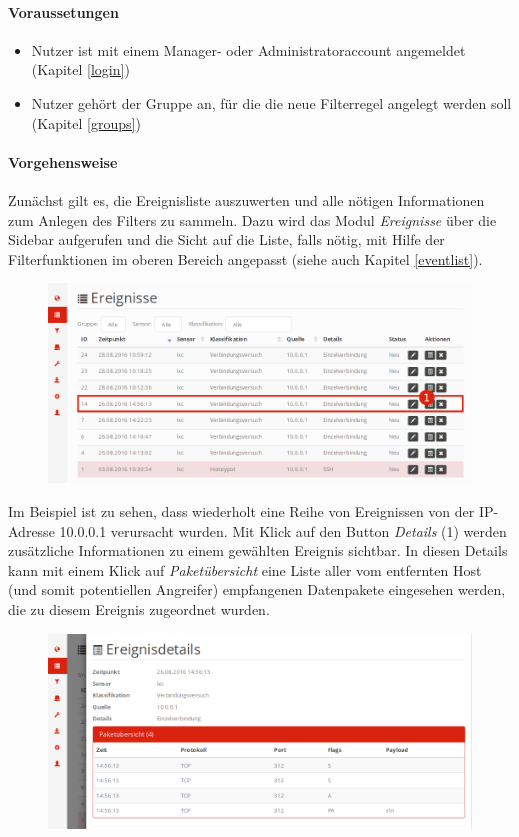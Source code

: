 \documentclass[12pt]{article}
\begin{document}
\paragraph{Voraussetungen}
\begin{itemize}
				\item Nutzer ist mit einem Manager- oder Administratoraccount angemeldet (Kapitel \ref{login})
				\item Nutzer gehört der Gruppe an, für die die neue Filterregel angelegt werden soll (Kapitel \ref{groups})
\end{itemize}
\paragraph{Vorgehensweise}
Zunächst gilt es, die Ereignisliste auszuwerten und alle nötigen Informationen zum Anlegen des Filters zu sammeln. Dazu wird das Modul \textit{Ereignisse} über die Sidebar aufgerufen und die Sicht auf die Liste, falls nötig, mit Hilfe der Filterfunktionen im oberen Bereich angepasst (siehe auch Kapitel \ref{eventlist}).
\begin{figure}[h]
				\centering
				\includegraphics[width=\textwidth]{./graphics/howto-event-filter-1.png}
				\label{fig:howto-event-filter-1}
\end{figure}
Im Beispiel ist zu sehen, dass wiederholt eine Reihe von Ereignissen von der IP-Adresse 10.0.0.1 verursacht wurden. Mit Klick auf den Button \textit{Details} (1) werden zusätzliche Informationen zu einem gewählten Ereignis sichtbar. In diesen Details kann mit einem Klick auf \textit{Paketübersicht} eine Liste aller vom entfernten Host (und somit potentiellen Angreifer) empfangenen Datenpakete eingesehen werden, die zu diesem Ereignis zugeordnet wurden.
\begin{figure}[h]
				\centering
				\includegraphics[width=\textwidth]{./graphics/howto-event-filter-2.png}
				\label{fig:howto-event-filter-2}
\end{figure}
\end{document}
